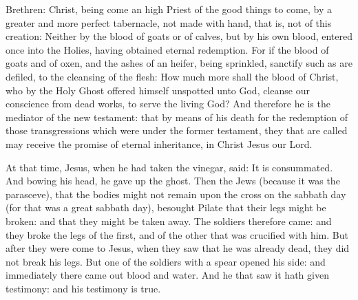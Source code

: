\begin{multicols}{2}
\bigskip




Brethren: Christ, being come an high Priest of the good things to come,
by a greater and more perfect tabernacle, not made with hand, that is,
not of this creation:
Neither by the blood of goats or of calves, but by his own blood,
entered once into the Holies, having obtained eternal redemption.
For if the blood of goats and of oxen, and the ashes of an heifer,
being sprinkled, sanctify such as are defiled, to the cleansing of the
flesh:
How much more shall the blood of Christ, who by the Holy Ghost
offered himself unspotted unto God, cleanse our conscience from dead
works, to serve the living God?
And therefore he is the mediator of the new testament: that by
means of his death for the redemption of those transgressions which were
under the former testament, they that are called may receive the promise
of eternal inheritance, in Christ Jesus our Lord.




At that time, Jesus, when he had taken the vinegar, said: It is
consummated. And bowing his head, he gave up the ghost.
Then the Jews (because it was the parasceve), that the bodies
might not remain upon the cross on the sabbath day (for that was a great
sabbath day), besought Pilate that their legs might be broken: and that
they might be taken away.
The soldiers therefore came: and they broke the legs of the
first, and of the other that was crucified with him.
But after they were come to Jesus, when they saw that he was
already dead, they did not break his legs.
But one of the soldiers with a spear opened his side: and
immediately there came out blood and water.
And he that saw it hath given testimony: and his testimony is
true. 

\bigskip






\end{multicols}
